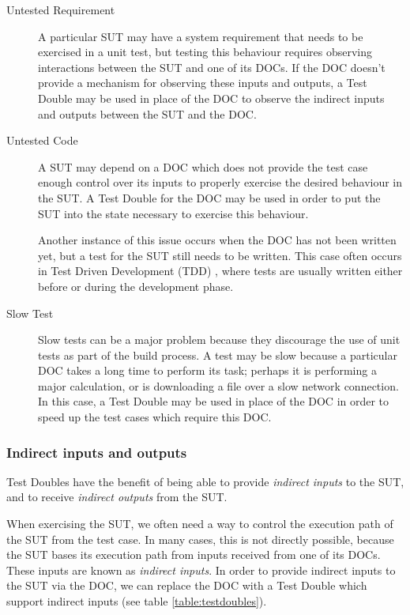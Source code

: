 \begin{description}

\item [Untested Requirement] A particular SUT may have a system
  requirement that needs to be exercised in a unit test, but testing
  this behaviour requires observing interactions between the SUT and
  one of its DOCs. If the DOC doesn't provide a mechanism for
  observing these inputs and outputs, a Test Double may be used in
  place of the DOC to observe the indirect inputs and outputs between
  the SUT and the DOC.

\item [Untested Code] A SUT may depend on a DOC which does not provide
  the test case enough control over its inputs to properly exercise
  the desired behaviour in the SUT. A Test Double for the DOC may be
  used in order to put the SUT into the state necessary to exercise
  this behaviour.

  Another instance of this issue occurs when the DOC has not been
  written yet, but a test for the SUT still needs to be written. This
  case often occurs in Test Driven Development (TDD) \cite{beck:tdd},
  where tests are usually written either before or during the
  development phase.

\item [Slow Test] Slow tests can be a major problem because they
  discourage the use of unit tests as part of the build process. A
  test may be slow because a particular DOC takes a long time to
  perform its task; perhaps it is performing a major calculation, or
  is downloading a file over a slow network connection. In this case,
  a Test Double may be used in place of the DOC in order to speed up
  the test cases which require this DOC.

\end{description}

\subsubsection{Indirect inputs and outputs}

Test Doubles have the benefit of being able to provide
\textit{indirect inputs} to the SUT, and to receive \textit{indirect
  outputs} from the SUT.

When exercising the SUT, we often need a way to control the
execution path of the SUT from the test case. In many cases, this is
not directly possible, because the SUT bases its execution path from
inputs received from one of its DOCs. These inputs are known as
\textit{indirect inputs}. In order to provide indirect inputs to the
SUT via the DOC, we can replace the DOC with a Test Double which
support indirect inputs (see table \ref{table:testdoubles}).

